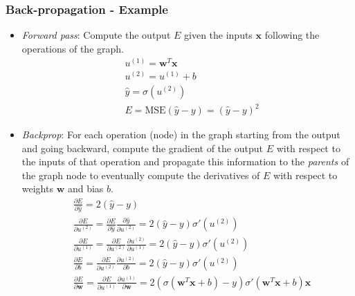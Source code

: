 \documentclass{beamer}
\begin{document}
	\begin{frame}
		\frametitle{Back-propagation - Example}
		\tiny
		\begin{itemize}
			\item \textit{Forward pass}: Compute the output $E$ given the inputs $\bm{x}$ following the operations of the graph.
			\begin{align*}
				&u^{(1)} = \bm{w}^T\bm{x} \\
				&u^{(2)} = u^{(1)} + b \\
				&\hat{y} = \sigma(u^{(2)}) \\
				&E = \textrm{MSE}(\hat{y}-y) = (\hat{y}-y)^2
			\end{align*}
			\item \textit{Backprop}:
			For each operation (node) in the graph starting from the output and going backward, compute the gradient of the output $E$ with respect to the inputs of that operation and propagate this information to the \textit{parents} of the graph node to eventually compute the derivatives of $E$ with respect to weights $\bm{w}$ and bias $b$.
			\begin{align*}
				&\frac{\partial E}{\partial \hat{y}} = 2(\hat{y}-y) \\
				&\frac{\partial E}{\partial u^{(2)}} = \frac{\partial E}{\partial \hat{y}} \frac{\partial \hat{y}}{\partial u^{(2)}} = 2(\hat{y}-y) \sigma'(u^{(2)})\\
				&\frac{\partial E}{\partial u^{(1)}} = \frac{\partial E}{\partial u^{(2)}}  \frac{\partial u^{(2)}}{\partial u^{(1)}}  = 2(\hat{y}-y) \sigma'(u^{(2)})  \\
				&\frac{\partial E}{\partial b}  = \frac{\partial E}{\partial u^{(2)}}  \frac{\partial u^{(2)}}{\partial b}  = 2(\hat{y}-y) \sigma'(u^{(2)})\\
				&\frac{\partial E}{\partial \bm{w}}  =\frac{\partial E}{\partial u^{(1)}} \frac{\partial u^{(1)}}{\partial \bm{w}}= 2( \sigma( \bm{w}^T\bm{x} +b)-y) \sigma'( \bm{w}^T\bm{x} +b) \bm{x}
			\end{align*}
		\end{itemize}
		
	\end{frame}
\end{document}

